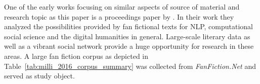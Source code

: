 One of the early works focusing on similar aspects of source of material and research topic as this paper is a proceedings paper by \citet{Milli2016BeyondFanfiction}.
In their work they analyzed the possibilities provided by fan fictional texts for NLP, computational social science and the digital humanities in general.
Large-scale literary data as well as a vibrant social network provide a huge opportunity for research in these areas.
A large fan fiction corpus as depicted in Table~\ref{tab:milli_2016_corpus_summary} was collected from \emph{FanFiction.Net} and served as study object.

